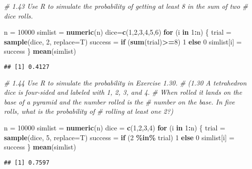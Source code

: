 \documentclass[
]{article}
\newenvironment{Shaded}{\begin{snugshade}}{\end{snugshade}}
\newcommand{\AttributeTok}[1]{\textcolor[rgb]{0.13,0.29,0.53}{#1}}
\newcommand{\CommentTok}[1]{\textcolor[rgb]{0.56,0.35,0.01}{\textit{#1}}}
\newcommand{\ControlFlowTok}[1]{\textcolor[rgb]{0.13,0.29,0.53}{\textbf{#1}}}
\newcommand{\DecValTok}[1]{\textcolor[rgb]{0.00,0.00,0.81}{#1}}
\newcommand{\FunctionTok}[1]{\textcolor[rgb]{0.13,0.29,0.53}{\textbf{#1}}}
\newcommand{\NormalTok}[1]{#1}
\newcommand{\OtherTok}[1]{\textcolor[rgb]{0.56,0.35,0.01}{#1}}
\newcommand{\SpecialCharTok}[1]{\textcolor[rgb]{0.81,0.36,0.00}{\textbf{#1}}}
\begin{document}
\begin{Shaded}
\begin{Highlighting}[]
\CommentTok{\# 1.43 Use R to simulate the probability of getting at least 8 in the sum of two}
\CommentTok{\# dice rolls.}

\NormalTok{n }\OtherTok{=} \DecValTok{10000}
\NormalTok{simlist }\OtherTok{=} \FunctionTok{numeric}\NormalTok{(n)}
\NormalTok{dice}\OtherTok{=}\FunctionTok{c}\NormalTok{(}\DecValTok{1}\NormalTok{,}\DecValTok{2}\NormalTok{,}\DecValTok{3}\NormalTok{,}\DecValTok{4}\NormalTok{,}\DecValTok{5}\NormalTok{,}\DecValTok{6}\NormalTok{)}
\ControlFlowTok{for}\NormalTok{ (i }\ControlFlowTok{in} \DecValTok{1}\SpecialCharTok{:}\NormalTok{n) \{}
\NormalTok{  trial }\OtherTok{=} \FunctionTok{sample}\NormalTok{(dice, }\DecValTok{2}\NormalTok{, }\AttributeTok{replace=}\NormalTok{T)}
\NormalTok{  success }\OtherTok{=} \ControlFlowTok{if}\NormalTok{ (}\FunctionTok{sum}\NormalTok{(trial)}\SpecialCharTok{\textgreater{}=}\DecValTok{8}\NormalTok{) }\DecValTok{1} \ControlFlowTok{else} \DecValTok{0}
\NormalTok{  simlist[i] }\OtherTok{=}\NormalTok{ success}
\NormalTok{\}}
\FunctionTok{mean}\NormalTok{(simlist)}
\end{Highlighting}
\end{Shaded}

\begin{verbatim}
## [1] 0.4127
\end{verbatim}

\begin{Shaded}
\begin{Highlighting}[]
\CommentTok{\# 1.44 Use R to simulate the probability in Exercise 1.30.}
\CommentTok{\# (1.30 A tetrahedron dice is four{-}sided and labeled with 1, 2, 3, and 4.}
\CommentTok{\# When rolled it lands on the base of a pyramid and the number rolled is the}
\CommentTok{\# number on the base. In five rolls, what is the probability of}
\CommentTok{\# rolling at least one 2?)}

\NormalTok{n }\OtherTok{=} \DecValTok{10000}
\NormalTok{simlist }\OtherTok{=} \FunctionTok{numeric}\NormalTok{(n)}
\NormalTok{dice }\OtherTok{=} \FunctionTok{c}\NormalTok{(}\DecValTok{1}\NormalTok{,}\DecValTok{2}\NormalTok{,}\DecValTok{3}\NormalTok{,}\DecValTok{4}\NormalTok{)}
\ControlFlowTok{for}\NormalTok{ (i }\ControlFlowTok{in} \DecValTok{1}\SpecialCharTok{:}\NormalTok{n) \{}
\NormalTok{  trial }\OtherTok{=} \FunctionTok{sample}\NormalTok{(dice, }\DecValTok{5}\NormalTok{, }\AttributeTok{replace=}\NormalTok{T)}
\NormalTok{  success }\OtherTok{=} \ControlFlowTok{if}\NormalTok{ (}\DecValTok{2} \SpecialCharTok{\%in\%}\NormalTok{ trial) }\DecValTok{1} \ControlFlowTok{else} \DecValTok{0}
\NormalTok{  simlist[i] }\OtherTok{=}\NormalTok{ success}
\NormalTok{\}}
\FunctionTok{mean}\NormalTok{(simlist)}
\end{Highlighting}
\end{Shaded}

\begin{verbatim}
## [1] 0.7597
\end{verbatim}
\end{document}
